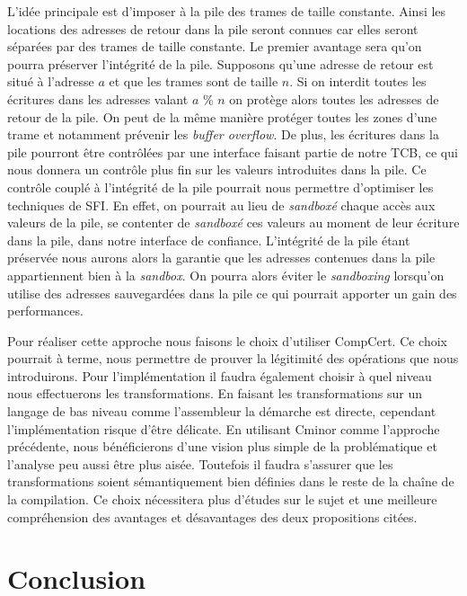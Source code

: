 \documentclass[11pt]{sdm}
\begin{document}
 L'idée principale est d'imposer à la pile des trames de taille constante. Ainsi les locations des adresses de retour dans la pile seront connues car elles seront séparées par des trames de taille constante. Le premier avantage sera qu'on pourra préserver l'intégrité de la pile. Supposons qu'une adresse de retour est situé à l'adresse $a$ et que les trames sont de taille $n$. Si on interdit toutes les écritures dans les adresses valant $a$ \% $n$ on protège alors toutes les adresses de retour de la pile. On peut de la même manière protéger toutes les zones d'une trame et notamment prévenir les \textit{buffer overflow}. De plus, les écritures dans la pile pourront être contrôlées par une interface faisant partie de notre TCB, ce qui nous donnera un contrôle plus fin sur les valeurs introduites dans la pile. Ce contrôle couplé à l'intégrité de la pile pourrait nous permettre d'optimiser les techniques de SFI. En effet, on pourrait au lieu de \textit{sandboxé} chaque accès aux valeurs de la pile, se contenter de \textit{sandboxé} ces valeurs au moment de leur écriture dans la pile, dans notre interface de confiance. L'intégrité de la pile étant préservée nous aurons alors la garantie que les adresses contenues dans la pile appartiennent bien à la \textit{sandbox}. On pourra alors éviter le \textit{sandboxing} lorsqu'on utilise des adresses sauvegardées dans la pile ce qui pourrait apporter un gain des performances.
 
	Pour réaliser cette approche nous faisons le choix d'utiliser CompCert. Ce choix pourrait à terme, nous permettre de prouver la légitimité des opérations que nous introduirons. Pour l'implémentation il faudra également choisir à quel niveau nous effectuerons les transformations. En faisant les transformations sur un langage de bas niveau comme l'assembleur la démarche est directe, cependant l'implémentation risque d'être délicate. En utilisant Cminor comme l'approche précédente, nous bénéficierons d'une vision plus simple de la problématique et l'analyse peu aussi être plus aisée. Toutefois il faudra s'assurer que les transformations soient sémantiquement bien définies dans le reste de la chaîne de la compilation. Ce choix nécessitera plus d'études sur le sujet et une meilleure compréhension des avantages et désavantages des deux propositions citées.

\section{Conclusion}
\end{document}

